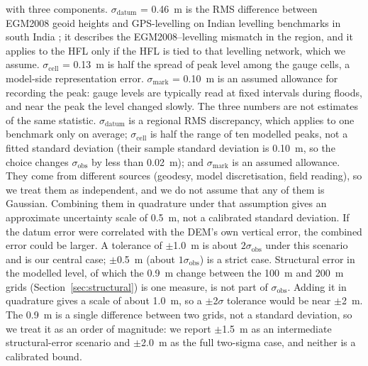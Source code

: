 \documentclass[preprint,12pt,authoryear]{elsarticle}
\begin{document}
with three components. $\sigma_\mathrm{datum}$ = 0.46~m is the RMS difference between EGM2008 geoid heights and GPS-levelling on Indian levelling benchmarks in south India \citep{srinivas2012}; it describes the EGM2008--levelling mismatch in the region, and it applies to the HFL only if the HFL is tied to that levelling network, which we assume. $\sigma_\mathrm{cell}$ = 0.13~m is half the spread of peak level among the gauge cells, a model-side representation error. $\sigma_\mathrm{mark}$ = 0.10~m is an assumed allowance for recording the peak: gauge levels are typically read at fixed intervals during floods, and near the peak the level changed slowly. The three numbers are not estimates of the same statistic. $\sigma_\mathrm{datum}$ is a regional RMS discrepancy, which applies to one benchmark only on average; $\sigma_\mathrm{cell}$ is half the range of ten modelled peaks, not a fitted standard deviation (their sample standard deviation is 0.10~m, so the choice changes $\sigma_\mathrm{obs}$ by less than 0.02~m); and $\sigma_\mathrm{mark}$ is an assumed allowance. They come from different sources (geodesy, model discretisation, field reading), so we treat them as independent, and we do not assume that any of them is Gaussian. Combining them in quadrature under that assumption gives an approximate uncertainty scale of 0.5~m, not a calibrated standard deviation. If the datum error were correlated with the DEM's own vertical error, the combined error could be larger. A tolerance of $\pm$1.0~m is about $2\sigma_\mathrm{obs}$ under this scenario and is our central case; $\pm$0.5~m (about $1\sigma_\mathrm{obs}$) is a strict case. Structural error in the modelled level, of which the 0.9~m change between the 100~m and 200~m grids (Section~\ref{sec:structural}) is one measure, is not part of $\sigma_\mathrm{obs}$. Adding it in quadrature gives a scale of about 1.0~m, so a $\pm$2$\sigma$ tolerance would be near $\pm$2~m. The 0.9~m is a single difference between two grids, not a standard deviation, so we treat it as an order of magnitude: we report $\pm$1.5~m as an intermediate structural-error scenario and $\pm$2.0~m as the full two-sigma case, and neither is a calibrated bound.
\end{document}
